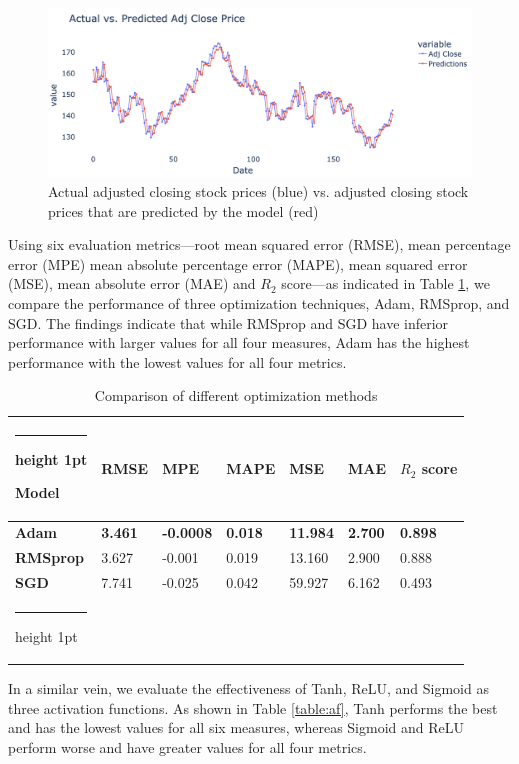 \documentclass[a4paper]{article}
\makeatletter
\newcommand{\thickhline}{%
    \noalign {\ifnum 0=`}\fi \hrule height 1pt
    \futurelet \reserved@a \@xhline
}
\makeatother
\begin{document}
\begin{figure}[!h]
    \centering
    \includegraphics[width=15cm]{r1_2.png}
    \caption{Actual adjusted closing stock prices (blue) vs. adjusted closing stock prices that are predicted by the model (red)}
    \label{fig:loss2}
\end{figure}

Using six evaluation metrics—root mean squared error (RMSE), mean percentage error (MPE) mean absolute percentage error (MAPE), mean squared error (MSE),  mean absolute error (MAE) and $R_2$ score—as indicated in Table \ref{table:oa}, we compare the performance of three optimization techniques, Adam, RMSprop, and SGD. The findings indicate that while RMSprop and SGD have inferior performance with larger values for all four measures, Adam has the highest performance with the lowest values for all four metrics.

\begin{table}[!h]
\centering
\caption{Comparison of different optimization methods}
\label{table:oa}
\vspace{5pt}
\begin{tabular}{lllllll}
\thickhline
\textbf{Model} & \textbf{RMSE} & \textbf{MPE} & \textbf{MAPE} & \textbf{MSE} &\textbf{ MAE} & \textbf{$R_2$ score} \\ 
\hline
\textbf{Adam} & \textbf{3.461} & \textbf{-0.0008} & \textbf{0.018} & \textbf{11.984} & \textbf{2.700} & \textbf{0.898}\\
\hline
\textbf{RMSprop} & 3.627 & -0.001 & 0.019 & 13.160 & 2.900 & 0.888 \\ 
\textbf{SGD} & 7.741 & -0.025 & 0.042 & 59.927 & 6.162 & 0.493 \\
\thickhline
\end{tabular}

\end{table}

In a similar vein, we evaluate the effectiveness of Tanh, ReLU, and Sigmoid as three activation functions. As shown in Table \ref{table:af}, Tanh performs the best and has the lowest values for all six measures, whereas Sigmoid and ReLU perform worse and have greater values for all four metrics. 
\end{document}
